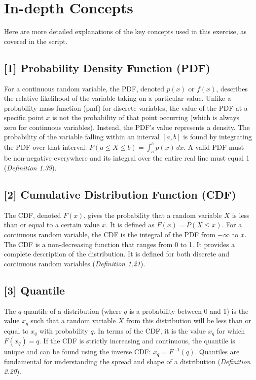 \documentclass[11pt,a4paper]{article}
\begin{document}
\newpage

\section{In-depth Concepts}

Here are more detailed explanations of the key concepts used in this exercise, as covered in the script.

\hypertarget{note:pdf}{\subsection*{[1] Probability Density Function (PDF)}}
For a continuous random variable, the PDF, denoted $p(x)$ or $f(x)$, describes the relative likelihood of the variable taking on a particular value. Unlike a probability mass function (pmf) for discrete variables, the value of the PDF at a specific point $x$ is not the probability of that point occurring (which is always zero for continuous variables). Instead, the PDF's value represents a density. The probability of the variable falling within an interval $[a, b]$ is found by integrating the PDF over that interval: $P(a \le X \le b) = \int_a^b p(x) \,dx$. A valid PDF must be non-negative everywhere and its integral over the entire real line must equal 1 (\textit{Definition 1.39}).

\hypertarget{note:cdf}{\subsection*{[2] Cumulative Distribution Function (CDF)}}
The CDF, denoted $F(x)$, gives the probability that a random variable $X$ is less than or equal to a certain value $x$. It is defined as $F(x) = P(X \le x)$. For a continuous random variable, the CDF is the integral of the PDF from $-\infty$ to $x$. The CDF is a non-decreasing function that ranges from 0 to 1. It provides a complete description of the distribution. It is defined for both discrete and continuous random variables (\textit{Definition 1.21}).

\hypertarget{note:quantile}{\subsection*{[3] Quantile}}
The $q$-quantile of a distribution (where $q$ is a probability between 0 and 1) is the value $x_q$ such that a random variable $X$ from this distribution will be less than or equal to $x_q$ with probability $q$. In terms of the CDF, it is the value $x_q$ for which $F(x_q) = q$. If the CDF is strictly increasing and continuous, the quantile is unique and can be found using the inverse CDF: $x_q = F^{-1}(q)$. Quantiles are fundamental for understanding the spread and shape of a distribution (\textit{Definition 2.20}).
\end{document}
